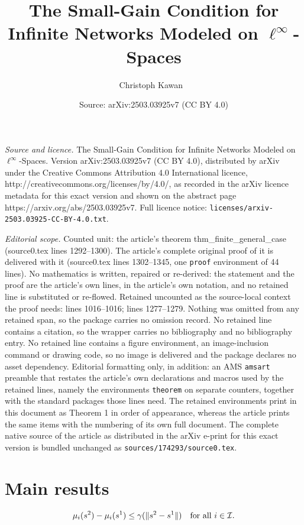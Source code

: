 \documentclass[10pt,a4paper]{amsart}
\title{The Small-Gain Condition for Infinite Networks Modeled on $\ell^{\infty}$-Spaces}
\author{Christoph Kawan\, \, }
\date{Source: arXiv:2503.03925v7 (CC BY 4.0)}
\newcommand{\IC}{\mathcal{I}}
\begin{document}
\maketitle

\noindent\emph{Source and licence.} The Small-Gain Condition for Infinite Networks Modeled on $\ell^{\infty}$-Spaces. Version arXiv:2503.03925v7 (CC BY 4.0), distributed by arXiv under the Creative Commons Attribution 4.0 International licence, http://creativecommons.org/licenses/by/4.0/, as recorded in the arXiv licence metadata for this exact version and shown on the abstract page https://arxiv.org/abs/2503.03925v7. Full licence notice: \texttt{licenses/arxiv-2503.03925-CC-BY-4.0.txt}.\par\smallskip

\noindent\textit{Editorial scope.} Counted unit: the article's theorem thm\_finite\_general\_case (source0.tex lines 1292--1300). The article's complete original proof of it is delivered with it (source0.tex lines 1302--1345, one \texttt{proof} environment of 44 lines). No mathematics is written, repaired or re-derived: the statement and the proof are the article's own lines, in the article's own notation, and no retained line is substituted or re-flowed.  Retained uncounted as the source-local context the proof needs: lines 1016--1016; lines 1277--1279.  Nothing was omitted from any retained span, so the package carries no omission record.  No retained line contains a citation, so the wrapper carries no bibliography and no bibliography entry.  No retained line contains a figure environment, an image-inclusion command or drawing code, so no image is delivered and the package declares no asset dependency.  Editorial formatting only, in addition: an AMS \texttt{amsart} preamble that restates the article's own declarations and macros used by the retained lines, namely the environments \texttt{theorem} on separate counters, together with the standard packages those lines need.  The retained environments print in this document as Theorem 1 in order of appearance, whereas the article prints the same items with the numbering of its own full document.  The complete native source of the article as distributed in the arXiv e-print for this exact version is bundled unchanged as \texttt{sources/174293/source0.tex}.
\section{Main results}\label{sec_final_theorem}

\begin{equation}\label{eq_mafs_uniform_cont}
  \mu_i(s^2) - \mu_i(s^1) \leq \gamma(\|s^2 - s^1\|) \mbox{\quad for all\ } i \in \IC.
\end{equation}
\end{document}
